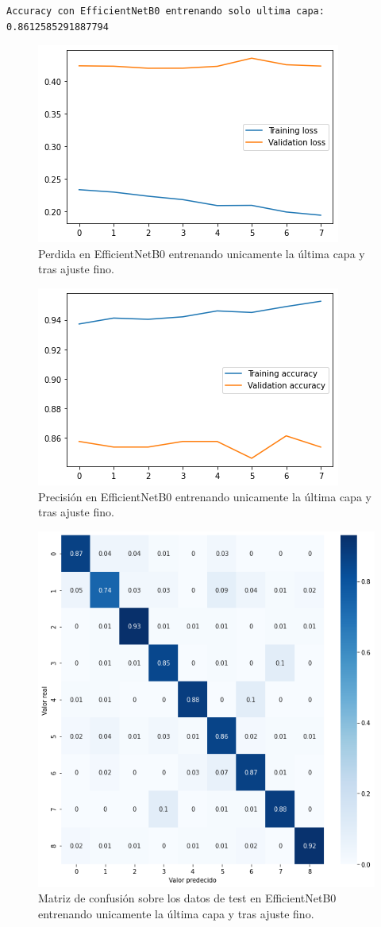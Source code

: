 \begin{lstlisting}
Accuracy con EfficientNetB0 entrenando solo ultima capa: 0.8612585291887794
\end{lstlisting}


\begin{figure}[H]
  \centering
  \includegraphics[width=0.5\linewidth]{Imagenes/entrenamiento_redes/ult/efficientnet_fine_loss.png}
  \caption{Perdida en EfficientNetB0 entrenando unicamente la última capa y tras ajuste fino.}
\end{figure}

\begin{figure}[H]
  \centering
  \includegraphics[width=0.5\linewidth]{Imagenes/entrenamiento_redes/ult/efficientnet_fine_acc.png}
  \caption{Precisión en EfficientNetB0 entrenando unicamente la última capa y tras ajuste fino.}
\end{figure}

\begin{figure}[H]
  \centering
  \includegraphics[width=0.5\linewidth]{Imagenes/entrenamiento_redes/ult/efficientnet_fine_matriz.png}
  \caption{Matriz de confusión sobre los datos de test en EfficientNetB0 entrenando unicamente la última capa y tras ajuste fino.}
\end{figure}

